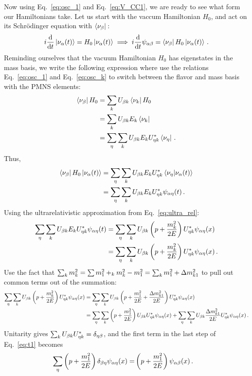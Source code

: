 Now using Eq.~\ref{eq:osc_1} and Eq.~\ref{eq:V_CC1}, we are ready to see what form our Hamiltonians take.
Let us start with the vaccum Hamiltonian $H_0$, and act on its Schrödinger equation with $\bra{\nu_\beta}\,$:
\begin{align}
    i \dv{}{t}\ket{\nu_\alpha (t)} = H_0\ket{\nu_\alpha (t)} \implies i \dv{}{t}\psi_{\alpha\beta} = \bra{\nu_\beta}H_0\ket{\nu_\alpha (t)}\,.
\end{align}
Reminding ourselves that the vacuum Hamiltonian $H_0$ has eigenstates in the mass basis, we write the following expression where 
use the relations Eq.~\ref{eq:osc_1} and Eq.~\ref{eq:osc_k} to switch between the flavor and mass basis with the PMNS elements:
\begin{align}
    \bra{\nu_\beta} H_0 &= \sum_k U_{\beta k} \bra{\nu_k}H_0 \nonumber \\
                     &= \sum_k U_{\beta k} E_k \bra{\nu_k} \nonumber \\
                     &= \sum_\eta \sum_k U_{\beta k} E_k U^*_{\eta k} \bra{\nu_\eta}\,.
\end{align}
Thus,
\begin{align}
    \bra{\nu_\beta}H_0\ket{\nu_\alpha (t)} &= \sum_\eta \sum_k U_{\beta k} E_k U^*_{\eta k} \bra{\nu_\eta}\ket{\nu_\alpha (t)} \nonumber \\
                                    &= \sum_\eta \sum_k U_{\beta k} E_k U^*_{\eta k} \psi_{\alpha\eta}(t)\,.
\end{align}
Using the ultrarelativistic approximation from Eq.~\ref{eq:ultra_rel}:
\begin{align}
    \sum_\eta \sum_k U_{\beta k} E_k U^*_{\eta k} \psi_{\alpha\eta}(t) &= \sum_\eta \sum_k U_{\beta k} \left(p + \frac{m^2_k}{2E}\right) U^*_{\eta k} \psi_{\alpha\eta}(x) \nonumber \\
    &= \sum_\eta \sum_k U_{\beta k} \left(p + \frac{m^2_k}{2E}\right) U^*_{\eta k} \psi_{\alpha\eta}(x)\,.
\end{align}
Use the fact that $\sum_k m_k^2 =  \sum m_1^2 +_k m^2_k - m^2_1 =\sum_k m_1^2 +  \dm_{k1}$ to pull out common terms out of the summation:
\begin{align}\label{eq:t1}
    \sum_\eta \sum_k U_{\b k} \left(p + \frac{m^2_k}{2E}\right) U^*_{\eta k} \psi_{\a\eta}(x) &= \sum_\eta \sum_k U_{\b k} \left(p + \frac{m^2_1}{2E} + \frac{\dm_{k1}}{2E}\right) U^*_{\eta k} \psi_{\a\eta}(x) \nonumber \\
    &= \sum_\eta\sum_k \left(p + \frac{m^2_1}{2E}\right) U_{\b k} U^*_{\eta k} \psi_{\a\eta}(x) + \sum_\eta\sum_k U_{\b k} \frac{\dm_{k1}}{2E} U^*_{\eta k} \psi_{\a\eta}(x)\,.
\end{align}
Unitarity gives $ \sum_k U_{\beta k} U^*_{\eta k} = \delta_{\eta\beta}$, and the first term in the last step of Eq.~\ref{eq:t1} becomes
\begin{align}
    \sum_\eta \left(p + \frac{m^2_1}{2E}\right) \delta_{\beta \eta} \psi_{\alpha\eta}(x)
    =& \left(p + \frac{m^2_1}{2E}\right) \psi_{\alpha\beta}(x)\,.
\end{align}

